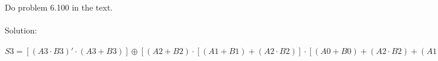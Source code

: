 Do problem 6.100 in the text.\\ \\

Solution: \\ \\
$S3 = [(A3 \cdot B3)' \cdot (A3 + B3)] \oplus [(A2 + B2) \cdot [(A1 + B1) + (A2 \cdot B2)] \cdot [(A0 + B0) + (A2 \cdot B2) + (A1 + B1)] \cdot [(A2 \cdot B2) + (A1 \cdot B1) + (A0 + B0) + C0]]$
